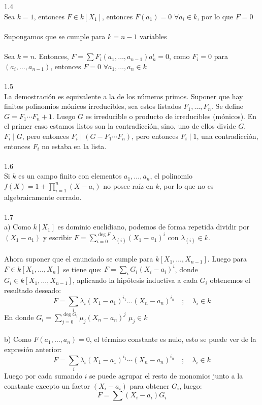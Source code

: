 \documentclass{article}
\begin{document}
\\
\\
1.4
\\
Sea $k=1$, entonces $F \in k[X_1]$, entonces $F(a_1)=0$ $\forall a_i \in k$, por lo que $F=0$
\\
\\
Supongamos que se cumple para $k=n-1$ variables
\\
\\
Sea $k=n$. Entonces, $F=\sum F_i(a_1,\dots,a_{n-1})a_{n}^{i}=0$, como $F_i=0$ para $(a_i,\dots,a_{n-1})$, entonces $F=0$ $\forall a_1,\dots,a_n \in k$
\\
\\
1.5
\\
La demostración es equivalente a la de los números primos. Suponer que hay finitos polinomios mónicos irreducibles, sea estos listados $F_1,\dots,F_n$. Se define $G=F_1 \cdots F_n +1$. Luego $G$ es irreducible o producto de irreducibles (mónicos). En el primer caso estamos listos son la contradicción, sino, uno de ellos divide $G$, $F_i \mid G$, pero entonces $F_i \mid (G-F_1 \cdots F_n)$, pero entonces $F_i \mid 1$, una contradicción, entonces $F_i$ no estaba en la lista. 
\\
\\
1.6
\\
Si $k$ es un campo finito con elementos $a_1,\dots,a_n$, el polinomio $f(X)=1+\prod_{i=1}^{n}(X-a_i)$ no posee raíz en $k$, por lo que no es algebraicamente cerrado.
\\
\\
1.7
\\
a) Como $k[X_1]$ es dominio euclidiano, podemos de forma repetida dividir por $(X_1 -a_1)$ y escribir $F=\sum_{i=0}^{\deg{F}} \lambda_{(i)} (X_1 -a_1)^{i}$ con $\lambda_{(i)} \in k$.
\\
\\
Ahora suponer que el enunciado se cumple para $k[X_1,\dots,X_{n-1}]$. Luego para $F \in k[X_1, \dots, X_n]$ se tiene que: $F=\sum_{i}G_i(X_i-a_i)^i$, donde $G_i \in k[X_1, \dots,X_{n-1}]$, aplicando la hipótesis inductiva a cada $G_i$ obtenemos el resultado deseado:
\begin{equation*}
    F = \sum_{i} \lambda_i (X_1 -a_1)^{i_1} \dots (X_n -a_n)^{i_n} \quad ; \quad \lambda_i \in k
\end{equation*}
En donde $G_i = \sum_{j=0}^{\deg{G_i}} \mu_j (X_n -a_n)^{j}$ $\mu_j \in k$
\\
\\
b) Como $F(a_1, \dots, a_n)=0$, el término constante es nulo, esto se puede ver de la expresión anterior:
\begin{equation*}
    F=\sum_{i} \lambda_i (X_1-a_1)^{i_1} \cdots (X_n -a_n)^{i_n} \quad ; \quad \lambda_i \in k
\end{equation*}
Luego por cada sumando $i$ se puede agrupar el resto de monomios junto a la constante excepto un factor $(X_i - a_i)$ para obtener $G_i$, luego:
\begin{equation*}
    F=\sum (X_i-a_i)G_i
\end{equation*}
\end{document}
